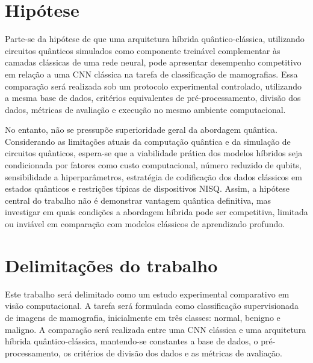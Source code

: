 \documentclass[
    12pt,
    openright,
    oneside,
    a4paper,
    english,
    brazil
]{abntex2}
\begin{document}
\section{Hipótese}

Parte-se da hipótese de que uma arquitetura híbrida quântico-clássica, utilizando circuitos quânticos simulados como componente treinável complementar às camadas clássicas de uma rede neural, pode apresentar desempenho competitivo em relação a uma CNN clássica na tarefa de classificação de mamografias. Essa comparação será realizada sob um protocolo experimental controlado, utilizando a mesma base de dados, critérios equivalentes de pré-processamento, divisão dos dados, métricas de avaliação e execução no mesmo ambiente computacional.

No entanto, não se pressupõe superioridade geral da abordagem quântica. Considerando as limitações atuais da computação quântica e da simulação de circuitos quânticos, espera-se que a viabilidade prática dos modelos híbridos seja condicionada por fatores como custo computacional, número reduzido de qubits, sensibilidade a hiperparâmetros, estratégia de codificação dos dados clássicos em estados quânticos e restrições típicas de dispositivos NISQ. Assim, a hipótese central do trabalho não é demonstrar vantagem quântica definitiva, mas investigar em quais condições a abordagem híbrida pode ser competitiva, limitada ou inviável em comparação com modelos clássicos de aprendizado profundo.

\section{Delimitações do trabalho}

Este trabalho será delimitado como um estudo experimental comparativo em visão computacional. A tarefa será formulada como classificação supervisionada de imagens de mamografia, inicialmente em três classes: normal, benigno e maligno. A comparação será realizada entre uma CNN clássica e uma arquitetura híbrida quântico-clássica, mantendo-se constantes a base de dados, o pré-processamento, os critérios de divisão dos dados e as métricas de avaliação.
\end{document}

